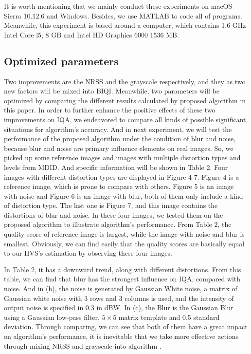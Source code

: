 \par It is worth mentioning that we mainly conduct these experiments on macOS Sierra 10.12.6 and Windows. Besides, we use MATLAB to code all of programs. Meanwhile, this experiment is based around a computer, which contains 1.6 GHz Intel Core i5, 8 GB and Intel HD Graphics 6000 1536 MB.







\subsection{Optimized parameters}

Two improvements are the NRSS and the grayscale respectively, and they as two new factors will be mixed into BIQI. Meanwhile, two parameters will be optimized by comparing the different results calculated by proposed algorithm in this paper. In order to further enhance the positive effects of these two improvements on IQA, we endeavored to compare all kinds of possible significant situations for algorithm's accuracy. And in next experiment, we will test the performance of the proposed algorithm under the condition of blur and noise, because blur and noise are primary influence elements on real images. So, we picked up some reference images and images with multiple distortion types and levels from MDID. And specific information will be shown in Table 2. Four images with different distortion types are displayed in Figure 4-7.  Figure 4 is a reference image, which is prone to compare with others. Figure 5 is an image with noise and Figure 6 is an image with blur, both of them only include a kind of distortion type. The last one is Figure 7, and this image contains the distortions of blur and noise. In these four images, we tested them on the proposed algorithm to illustrate algorithm's performance. From Table 2, the quality score of reference image is largest, while the image with noise and blur is smallest. Obviously, we can find easily that the quality scores are basically equal to our HVS's estimation by observing these four images.

In Table 2, it has a downward trend, along with different distortions. From this table, we can find that blur has the strongest influence on IQA, compared with noise. And in (b), the noise is generated by Gaussian White noise, a matrix of Gaussian white noise with 3 rows and 3 columns is used, and the intensity of output noise is specified in 0.3 in dBW. In (c), the Blur is the Gaussian Blur using a Gaussian low-pass filter, $5\times5$ matrix template and 0.5 standard deviation. Through comparing, we can see that both of them have a great impact on algorithm's performance, it is inevitable that we take more effective actions through mixing NRSS and grayscale into algorithm .


